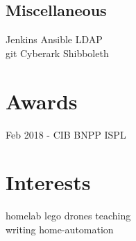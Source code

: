 \documentclass[letterpaper]{deedy-resume} %
\begin{document}
\begin{minipage}[t]{0.28\textwidth}
\subsection{Miscellaneous}
Jenkins \textbullet{} Ansible \textbullet{} LDAP \\
git \textbullet{} Cyberark  \textbullet{} Shibboleth


\sectionspace %

\section{Awards}
Feb 2018 - CIB BNPP ISPL

\sectionspace %

\section{Interests}
homelab \textbullet{} lego \textbullet{} drones \textbullet{} teaching \\
writing \textbullet{} home-automation

\end{minipage} %
\hfill
%
%
\end{document}
